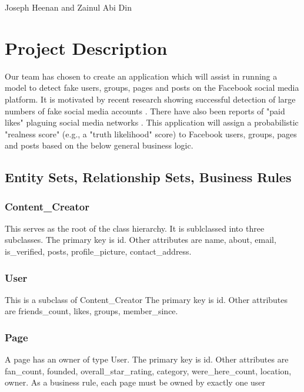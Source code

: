 \documentclass{article}
\begin{document}
\begin{center}
\begin{LARGE}{Joseph Heenan and Zainul Abi Din} \end{LARGE}
\end{center}

\section{Project Description}

Our team has chosen to create an application which will assist in running a model to detect fake users, groups, pages and posts on the Facebook social media platform. It is motivated by recent research showing successful detection of large numbers of fake social media accounts \cite{2017arXiv170102405E}. There have also been reports of "paid likes"  plaguing social media networks \cite{TheBotBubble}. This application will assign a probabilistic "realness score" (e.g., a "truth likelihood" score) to Facebook users, groups, pages and posts based on the below general business logic.

\subsection{Entity Sets, Relationship Sets, Business Rules}

\subsubsection{Content_Creator}
This serves as the root of the class hierarchy. It is sublclassed into three subclasses. The primary key is id. Other attributes are name, about, email, is_verified, posts, profile_picture, contact_address.


\subsubsection{User}

This is a subclass of Content_Creator
The primary key is id. Other attributes are friends_count, likes, groups, member_since.

\subsubsection{Page}
A page has an owner of type User. The primary key is id. Other attributes are fan_count, founded, overall_star_rating, category, were_here_count, location, owner.  As a business rule, each page must be owned by exactly one user
\end{document}
